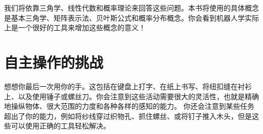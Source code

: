 
我们将依靠三角学、线性代数和概率理论来回答这些问题。本书将使用的具体概念是基本三角学、矩阵表示法、贝叶斯公式和概率分布概念。你会看到机器人学实际上是一个很好的工具来增加这些概念的意义！


\section{自主操作的挑战}


想想你最后一次用你的手。这包括在键盘上打字、在纸上书写、将纽扣缝在衬衫上、以及使用锤子或螺丝刀。你会注意到这些活动需要很大的灵活性，也就是精确地操纵物体、很大范围的力度和各种各样的感知的能力。 你还会注意到某些任务超出了你的能力，例如将纱线穿过织物孔、抓住螺丝、或将钉子推入木头，但是这些可以使用正确的工具轻松解决。


